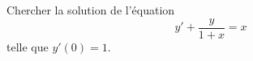 \begin{exercice}\label{exoEquaDiff0008}

Chercher la solution de l'équation
\begin{equation}
	y'+\frac{ y }{ 1+x }=x
\end{equation}
telle que $y'(0)=1$.

\end{exercice}
